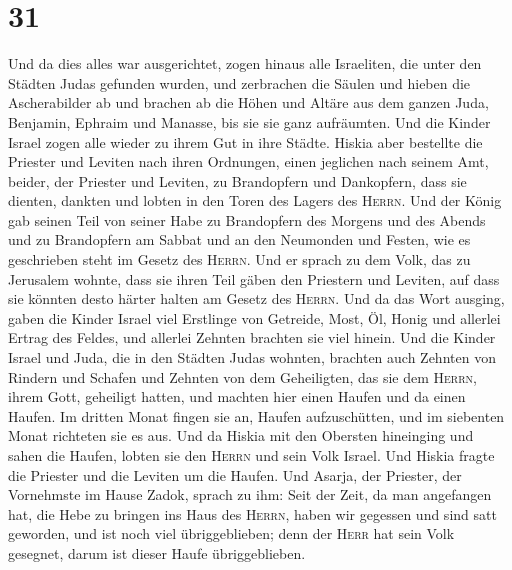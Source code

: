 \hypertarget{section-30}{%
\section{31}\label{section-30}}

 Und da dies alles war ausgerichtet, zogen hinaus alle
Israeliten, die unter den Städten Judas gefunden wurden, und zerbrachen
die Säulen und hieben die Ascherabilder ab und brachen ab die Höhen und
Altäre aus dem ganzen Juda, Benjamin, Ephraim und Manasse, bis sie sie
ganz aufräumten. Und die Kinder Israel zogen alle wieder zu ihrem Gut in
ihre Städte.  Hiskia aber bestellte die Priester und
Leviten nach ihren Ordnungen, einen jeglichen nach seinem Amt, beider,
der Priester und Leviten, zu Brandopfern und Dankopfern, dass sie
dienten, dankten und lobten in den Toren des Lagers des \textsc{Herrn}.
 Und der König gab seinen Teil von seiner Habe zu
Brandopfern des Morgens und des Abends und zu Brandopfern am Sabbat und
an den Neumonden und Festen, wie es geschrieben steht im Gesetz des
\textsc{Herrn}.  Und er sprach zu dem Volk, das zu
Jerusalem wohnte, dass sie ihren Teil gäben den Priestern und Leviten,
auf dass sie könnten desto härter halten am Gesetz des \textsc{Herrn}.
 Und da das Wort ausging, gaben die Kinder Israel viel
Erstlinge von Getreide, Most, Öl, Honig und allerlei Ertrag des Feldes,
und allerlei Zehnten brachten sie viel hinein.  Und die
Kinder Israel und Juda, die in den Städten Judas wohnten, brachten auch
Zehnten von Rindern und Schafen und Zehnten von dem Geheiligten, das sie
dem \textsc{Herrn}, ihrem Gott, geheiligt hatten, und machten hier einen
Haufen und da einen Haufen.  Im dritten Monat fingen sie
an, Haufen aufzuschütten, und im siebenten Monat richteten sie es aus.
 Und da Hiskia mit den Obersten hineinging und sahen die
Haufen, lobten sie den \textsc{Herrn} und sein Volk Israel.
 Und Hiskia fragte die Priester und die Leviten um die
Haufen.  Und Asarja, der Priester, der Vornehmste im
Hause Zadok, sprach zu ihm: Seit der Zeit, da man angefangen hat, die
Hebe zu bringen ins Haus des \textsc{Herrn}, haben wir gegessen und sind
satt geworden, und ist noch viel übriggeblieben; denn der \textsc{Herr}
hat sein Volk gesegnet, darum ist dieser Haufe übriggeblieben.

